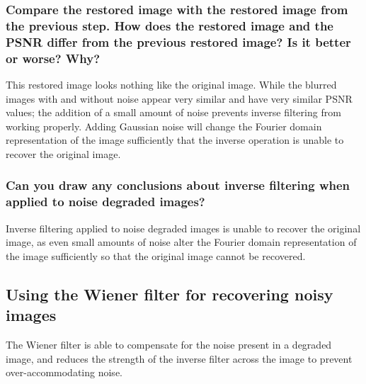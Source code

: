 \begin{figure}[ht]
\centering
\end{figure}


\subsubsection{Compare the restored image with the restored image from the previous step. How does the restored image and the PSNR differ from the previous restored image? Is it better or worse? Why?}

This restored image looks nothing like the original image. While the blurred images with and without noise appear very similar and have very similar PSNR values; the addition of a small amount of noise prevents inverse filtering from working properly. Adding Gaussian noise will change the Fourier domain representation of the image sufficiently that the inverse operation is unable to recover the original image.

\subsubsection{Can you draw any conclusions about inverse filtering when applied to noise degraded images?}

Inverse filtering applied to noise degraded images is unable to recover the original image, as even small amounts of noise alter the Fourier domain representation of the image sufficiently so that the original image cannot be recovered.


\subsection{Using the Wiener filter for recovering noisy images}

The Wiener filter is able to compensate for the noise present in a degraded image, and reduces the strength of the inverse filter across the image to prevent over-accommodating noise.

